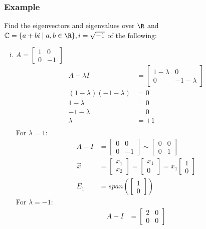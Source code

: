 \documentclass[letterpaper, 12pt]{math}
\begin{document}
\subsubsection*{Example}
Find the eigenvectors and eigenvalues over \( \R \) and \( \mathbb{C} =
\{a+bi\mid a,b\in\R\}, i = \sqrt{-1} \) of the following:
\begin{enumerate}[(i)]
  \item \( A = \begin{bmatrix}1 & 0 \\ 0 & -1\end{bmatrix} \)
  \begin{align*}
    A-\lambda I &= \begin{bmatrix}
      1-\lambda & 0 \\
      0 & -1-\lambda
    \end{bmatrix} \\
    (1-\lambda)(-1-\lambda) &= 0 \\
    1-\lambda &= 0 \\
    -1-\lambda &= 0 \\
    \lambda &= \pm1 \\
  \end{align*}
  For \( \lambda = 1 \):
  \begin{align*}
    A-I &= \begin{bmatrix}0 & 0 \\ 0 & -1\end{bmatrix}
      \sim \begin{bmatrix}0 & 0 \\ 0 & 1\end{bmatrix} \\
    \vec{x} &= \begin{bmatrix}x_1 \\ x_2\end{bmatrix}
      = \begin{bmatrix}x_1 \\ 0\end{bmatrix}
      = x_1\begin{bmatrix}1 \\ 0\end{bmatrix} \\
    E_1 &= span\left(\begin{bmatrix}1 \\ 0\end{bmatrix}\right)
  \end{align*}
  For \( \lambda = -1 \):
  \begin{align*}
    A+I &= \begin{bmatrix}2 & 0 \\ 0 & 0\end{bmatrix}

\end{align*}
\end{enumerate}
\end{document}
